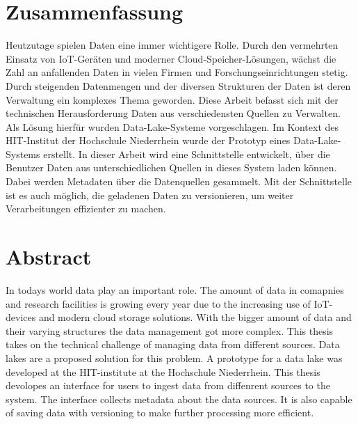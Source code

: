 \section*{Zusammenfassung}

Heutzutage spielen Daten eine immer wichtigere Rolle.
Durch den vermehrten Einsatz von IoT-Geräten und moderner Cloud-Speicher-Lösungen, wächst die Zahl an anfallenden Daten in vielen Firmen und Forschungseinrichtungen stetig.
Durch steigenden Datenmengen und der diversen Strukturen der Daten ist deren Verwaltung ein komplexes Thema geworden.
Diese Arbeit befasst sich mit der technischen Herausforderung Daten aus verschiedensten Quellen zu Verwalten.
Als Lösung hierfür wurden Data-Lake-Systeme vorgeschlagen.
Im Kontext des HIT-Institut der Hochschule Niederrhein wurde der Prototyp eines Data-Lake-Systems erstellt.
In dieser Arbeit wird eine Schnittstelle entwickelt, über die Benutzer Daten aus unterschiedlichen Quellen in dieses System laden können.
Dabei werden Metadaten über die Datenquellen gesammelt.
Mit der Schnittstelle ist es auch möglich, die geladenen Daten zu versionieren, um weiter Verarbeitungen effizienter zu machen.

\section*{Abstract}

In todays world data play an important role.
The amount of data in comapnies and research facilities is growing every year due to the increasing use of IoT-devices and modern cloud storage solutions.
With the bigger amount of data and their varying structures the data management got more complex.
This thesis takes on the technical challenge of managing data from different sources.
Data lakes are a proposed solution for this problem.
A prototype for a data lake was developed at the HIT-institute at the Hochschule Niederrhein.
This thesis devolopes an interface for users to ingest data from diffenrent sources to the system.
The interface collects metadata about the data sources.
It is also capable of saving data with versioning to make further processing more efficient.